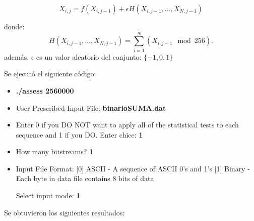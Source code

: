 \documentclass[12pt,3p]{elsarticle}
\begin{document}
\begin{equation}
X_{i,j}= f(X_{i,j-1})+ \epsilon  H(X_{i,j-1},...,X_{N,j-1})
\end{equation}

donde:
\begin{equation}
H(X_{i,j-1},...,X_{N,j-1}) = \sum_{i=1}^{N}(X_{i,j-1}\mod 256).
\end{equation}
además, $\epsilon$ es un valor aleatorio del conjunto: ${\{-1, 0, 1 \}}$



Se ejecutó el siguiente código:

\begin{itemize}
\item \textbf{./assess 2560000}
\item User Prescribed Input File: \textbf{binarioSUMA.dat}
\item    Enter 0 if you DO NOT want to apply all of the
         statistical tests to each sequence and 1 if you DO. Enter chice: \textbf{1}
                  
\item  How many bitstreams? \textbf{1}

\item Input File Format:
    [0] ASCII - A sequence of ASCII 0's and 1's
    [1] Binary - Each byte in data file contains 8 bits of data

   Select input mode:  \textbf{1}
\end{itemize}


Se obtuvieron los siguientes resultados:
\end{document}
